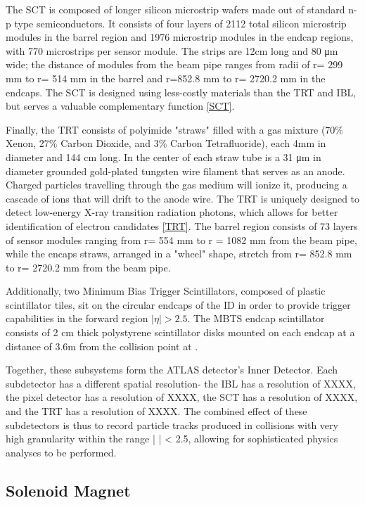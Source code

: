 The SCT is composed of longer silicon microstrip wafers made out of standard n-p type semiconductors. It consists of four layers of 2112 total silicon microstrip modules in the barrel region and 1976 microstrip modules in the endcap regions, with 770 microstrips per sensor module. The strips are 12cm long and 80 μm wide; the distance of modules from the beam pipe ranges from radii of r= 299 mm to r= 514 mm in the barrel and r=852.8 mm to r= 2720.2 mm in the endcaps. The SCT is designed using less-costly materials than the TRT and IBL, but serves a valuable complementary function \ref{SCT}.

Finally, the TRT consists of polyimide "straws" filled with a gas mixture (70\% Xenon, 27\% Carbon Dioxide, and 3\% Carbon Tetrafluoride), each 4mm in diameter and 144 cm long. In the center of each straw tube is a 31 μm in diameter grounded gold-plated tungsten wire filament that serves as an anode. Charged particles travelling through the gas medium will ionize it, producing a cascade of ions that will drift to the anode wire. The TRT is uniquely designed to detect low-energy X-ray transition radiation photons, which allows for better identification of electron candidates \ref{TRT}. The barrel region consists of 73 layers of sensor modules ranging from r= 554 mm to r = 1082 mm from the beam pipe, while the encaps straws, arranged in a "wheel" shape, stretch from r= 852.8 mm to r= 2720.2 mm from the beam pipe. 

Additionally, two Minimum Bias Trigger Scintillators, composed of plastic scintillator tiles, sit on the circular endcaps of the ID in order to provide trigger capabilities in the forward region \(|\eta| > 2.5 \). The MBTS endcap scintillator consists of 2 cm thick polystyrene scintillator disks mounted on each endcap at a distance of 3.6m from the collision point at . 

Together, these subsystems form the ATLAS detector's Inner Detector. Each subdetector has a different spatial resolution- the IBL has a resolution of XXXX, the pixel detector has a resolution of XXXX, the SCT has a resolution of XXXX, and the TRT has a resolution of XXXX. The combined effect of these subdetectors is thus to record particle tracks produced in collisions with very high granularity within the range | \eta | < 2.5, allowing for sophisticated physics analyses to be performed. 

\subsection{Solenoid Magnet} \label{sec:solenoid}

